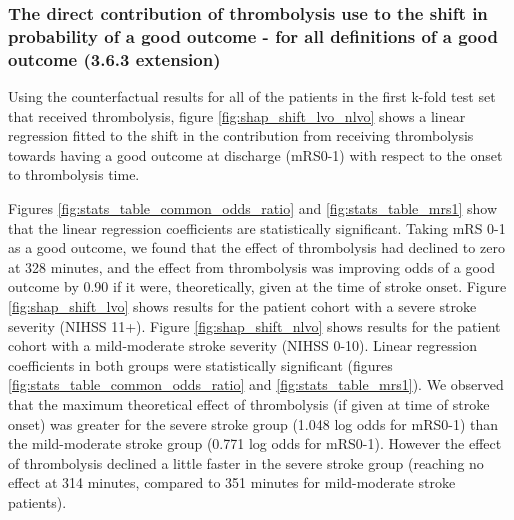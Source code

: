 \subsubsection{The direct contribution of thrombolysis use to the shift in probability of a good outcome - for all definitions of a good outcome (3.6.3 extension)}

Using the counterfactual results for all of the patients in the first k-fold test set that received thrombolysis, figure \ref{fig:shap_shift_lvo_nlvo} shows a linear regression fitted to the shift in the contribution from receiving thrombolysis towards having a good outcome at discharge (mRS0-1) with respect to the onset to thrombolysis time. 

Figures \ref{fig:stats_table_common_odds_ratio} and \ref{fig:stats_table_mrs1} show that the linear regression coefficients are statistically significant. Taking mRS 0-1 as a good outcome, we found that the effect of thrombolysis had declined to zero at 328 minutes, and the effect from thrombolysis was improving odds of a good outcome by 0.90 if it were, theoretically, given at the time of stroke onset. Figure \ref{fig:shap_shift_lvo} shows results for the patient cohort with a severe stroke severity (NIHSS 11+). Figure \ref{fig:shap_shift_nlvo} shows results for the patient cohort with a mild-moderate stroke severity (NIHSS 0-10). Linear regression coefficients in both groups were statistically significant (figures \ref{fig:stats_table_common_odds_ratio} and \ref{fig:stats_table_mrs1}). We observed that the maximum theoretical effect of thrombolysis (if given at time of stroke onset) was greater for the severe stroke group (1.048 log odds for mRS0-1) than the mild-moderate stroke group (0.771 log odds for mRS0-1). However the effect of thrombolysis declined a little faster in the severe stroke group (reaching no effect at 314 minutes, compared to 351 minutes for mild-moderate stroke patients).

